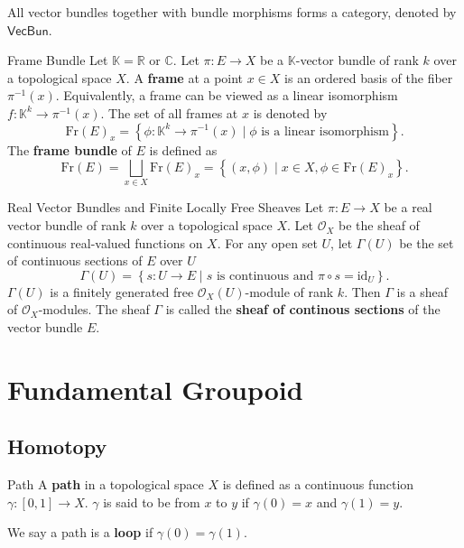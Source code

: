 \documentclass{report}
\begin{document}
All vector bundles together with bundle morphisms forms a category, denoted by $\mathsf{VecBun}$.

\begin{definition}{Frame Bundle}{}
	Let $\mathbb{K}=\mathbb{R}\text{ or }\mathbb{C}$. Let $\pi:E\to X$ be a $\mathbb{K}$-vector bundle of rank $k$ over a topological space $X$. A \textbf{frame} at a point $x\in X$ is an ordered basis of the fiber $\pi^{-1}(x)$. Equivalently, a frame can be viewed as a linear isomorphism $f:\mathbb{K}^k\to \pi^{-1}(x)$. The set of all frames at $x$ is denoted by
	\[
		\mathrm{Fr}(E)_x=\left\{\phi:\mathbb{K}^k\longrightarrow \pi^{-1}(x)\mid \phi\text{ is a linear isomorphism}\right\}.
	\]
	The \textbf{frame bundle} of $E$ is defined as
	\[
		\mathrm{Fr}(E)=\bigsqcup_{x\in X}\mathrm{Fr}(E)_x =\left\{(x,\phi)\mid x\in X,\phi\in \mathrm{Fr}(E)_x\right\}.
	\]
\end{definition}

\begin{proposition}{Real Vector Bundles and Finite Locally Free Sheaves}{}
	Let $\pi:E\to X$ be a real vector bundle of rank $k$ over a topological space $X$. Let $\mathcal{O}_X$ be the sheaf of continuous real-valued functions on $X$. For any open set $U$, let $\Gamma(U)$ be the set of continuous sections of $E$ over $U$
	\[
		\Gamma(U)=\left\{s:U\to E\mid s\text{ is continuous and }\pi\circ s=\mathrm{id}_U\right\}.
	\]
	$\Gamma(U)$ is a finitely generated free $\mathcal{O}_X(U)$-module of rank $k$. Then $\Gamma$ is a sheaf of $\mathcal{O}_X$-modules. The sheaf $\Gamma$ is called the \textbf{sheaf of continous sections} of the vector bundle $E$. 
	
\end{proposition}


\chapter{Fundamental Groupoid}
\section{Homotopy}
\begin{definition}{Path}{}
	A \textbf{path} in a topological space $X$ is defined as a continuous function $\gamma:[0,1]\to X$. $\gamma$ is said to be from $x$ to $y$ if $\gamma(0)=x$ and $\gamma(1)=y$.
\end{definition}

We say a path is a \textbf{loop} if $\gamma(0)=\gamma(1)$.
\end{document}
